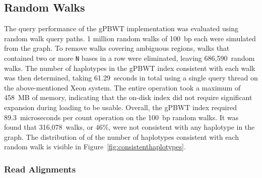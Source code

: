 \subsection{Random Walks}

The query performance of the gPBWT implementation was evaluated using random walk query paths. 1 million random walks of 100~bp each were simulated from the graph. To remove walks covering ambiguous regions, walks that contained two or more \texttt{N} bases in a row were eliminated, leaving 686,590~random walks. The number of haplotypes in the gPBWT index consistent with each walk was then determined, taking 61.29~seconds in total using a single query thread on the above-mentioned Xeon system. The entire operation took a maximum of 458~MB of memory, indicating that the on-disk index did not require significant expansion during loading to be usable. Overall, the gPBWT index required 89.3~microseconds per count operation on the 100~bp random walks. It was found that 316,078~walks, or 46\%, were not consistent with any haplotype in the graph. The distribution of of the number of haplotypes consistent with each random walk is visible in Figure~\ref{fig:consistenthaplotypes}. 

\subsubsection{Read Alignments}

